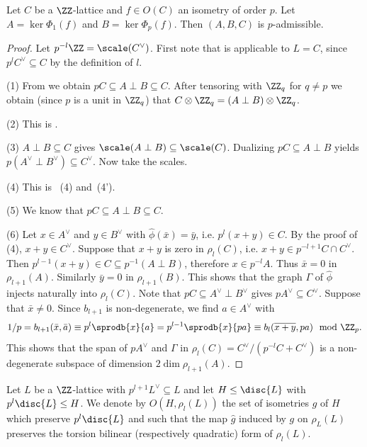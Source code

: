 \begin{lemma}\label{ispadmissible}
 Let $C$ be a $\ZZ$-lattice and $f \in O(C)$ an isometry of order $p$.
 Let $A = \ker \Phi_1(f)$ and $B = \ker \Phi_p(f)$.
 Then $(A,B,C)$ is $p$-admissible.
\end{lemma}
\begin{proof}
  Let $p^{-l}\ZZ = \scale(C^\vee)$.
  First note that  is applicable to $L = C$, since $p^{l}C^\vee \subseteq C$ by the definition of $l$.

(1) From  we obtain $pC \subseteq A\perp B \subseteq C$. After tensoring with $\ZZ_q$ for $q\neq p$ we obtain (since $p$ is a unit in $\ZZ_q$) that $C \otimes \ZZ_q = (A\perp B)\otimes \ZZ_q$.

(2) This is .

(3) $A \perp B \subseteq C$ gives $\scale(A\perp B) \subseteq \scale(C)$.
Dualizing $pC \subseteq A\perp B$ yields $p (A^\vee \perp B^\vee) \subseteq C^\vee$. Now take the scales.

(4) This is ~(4) and~(4').

(5) We know that $pC \subseteq A\perp B \subseteq C$.

(6) Let $x \in A^\vee$ and $y \in B^\vee$ with $\hat \phi(\bar x) = \bar y$, i.e. $p^l(x+y)\in C$.
By the proof of  (4), $x+y \in C^\vee$.
Suppose that $x+y$ is zero in $\rho_l(C)$, i.e. $x+y \in p^{-l+1}C \cap C^\vee$. Then $p^{l-1} (x+y) \in C\subseteq p^{-1}(A\perp B)$, therefore
$x \in p^{-l} A$. Thus $\bar x = 0$ in $\rho_{l+1}(A)$. Similarly $\bar y = 0$ in $\rho_{l+1}(B)$. This shows that
the graph $\Gamma$ of $\hat \phi$ injects naturally into $\rho_l(C)$.
Note that $p C \subseteq A^\vee \perp B^\vee$ gives $p A^\vee \subseteq C^\vee$.
Suppose that $\bar x \neq 0$.
Since $b_{l+1}$ is non-degenerate, we find $a \in A^\vee$ with
\[1/p = b_{l+1}(\bar x, \bar a)\equiv  p^l \sprodb{x}{a} = p^{l-1}\sprodb{x}{pa} \equiv b_{l}(\overline{x+y},p a) \mod \ZZ_p.\]
This shows that the span of $p A^\vee$ and
$\Gamma$ in $\rho_l(C)=C^\vee/(p^{-l}C + C^\vee)$ is a non-degenerate subspace of dimension $2 \dim \rho_{l+1}(A)$.
\end{proof}

\begin{definition}
  Let $L$ be a $\ZZ$-lattice with $p^{l+1} L^\vee \subseteq L$ and let $H\leq \disc{L}$ with $p^{l} \disc{L} \leq H$. We denote by
 $O(H,\rho_l(L))$ the set of isometries $g$ of $H$ which preserve $p^l\disc{L}$ and such that the map $\hat g$ induced by $g$ on $\rho_L(L)$ preserves the torsion bilinear (respectively quadratic) form of $\rho_l(L)$.
\end{definition}

